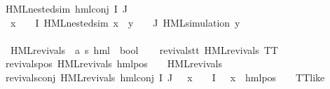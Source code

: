 \begin{isabellebody}
{\isachardoublequoteopen}HML{\isacharunderscore}{\kern0pt}{}{\isacharunderscore}{\kern0pt}nested{\isacharunderscore}{\kern0pt}sim\ {\isacharparenleft}{\kern0pt}hml{\isacharunderscore}{\kern0pt}conj\ I\ J\ {\isasymPhi}{\isacharparenright}{\kern0pt}{\isachardoublequoteclose}\ \isanewline
{}\ {\isachardoublequoteopen}{\isacharparenleft}{\kern0pt}{\isasymforall}x\ {\isasymin}\ {\isacharparenleft}{\kern0pt}{\isasymPhi}\ {\isacharbackquote}{\kern0pt}\ I{\isacharparenright}{\kern0pt}{\isachardot}{\kern0pt}\ HML{\isacharunderscore}{\kern0pt}{}{\isacharunderscore}{\kern0pt}nested{\isacharunderscore}{\kern0pt}sim\ x{\isacharparenright}{\kern0pt}\ {\isasymand}\ {\isacharparenleft}{\kern0pt}{\isasymforall}y\ {\isasymin}\ {\isacharparenleft}{\kern0pt}{\isasymPhi}\ {\isacharbackquote}{\kern0pt}\ J{\isacharparenright}{\kern0pt}{\isachardot}{\kern0pt}\ HML{\isacharunderscore}{\kern0pt}simulation\ y{\isacharparenright}{\kern0pt}{\isachardoublequoteclose}\isanewline
\ \ \ \ \ \ \ \ \ \ \ \ \ \ \ \ \ \ \ \ \ \ \ \ \ \ \ \ \ \ \ \ \ \ \ \ \ \ \ \ \ \ \ \ \ \ \ \ \ \ \ \ \ \ \ \ \ \ \ \ \ \ \ \ \isanewline
{}\isamarkupfalse%
\ HML{\isacharunderscore}{\kern0pt}revivals\ {\isacharcolon}{\kern0pt}{\isacharcolon}{\kern0pt}\ {\isachardoublequoteopen}{\isacharparenleft}{\kern0pt}{\isacharprime}{\kern0pt}a{\isacharcomma}{\kern0pt}\ {\isacharprime}{\kern0pt}s{\isacharparenright}{\kern0pt}\ hml\ {\isasymRightarrow}\ bool{\isachardoublequoteclose}\ \isanewline
\ \ \isanewline
revivals{\isacharunderscore}{\kern0pt}tt{\isacharcolon}{\kern0pt}\ {\isachardoublequoteopen}HML{\isacharunderscore}{\kern0pt}revivals\ TT{\isachardoublequoteclose}\ {\isacharbar}{\kern0pt}\isanewline
revivals{\isacharunderscore}{\kern0pt}pos{\isacharcolon}{\kern0pt}\ {\isachardoublequoteopen}HML{\isacharunderscore}{\kern0pt}revivals\ {\isacharparenleft}{\kern0pt}hml{\isacharunderscore}{\kern0pt}pos\ {\isasymalpha}\ {\isasymphi}{\isacharparenright}{\kern0pt}{\isachardoublequoteclose}\ \ {\isachardoublequoteopen}HML{\isacharunderscore}{\kern0pt}revivals\ {\isasymphi}{\isachardoublequoteclose}\ {\isacharbar}{\kern0pt}\isanewline
revivals{\isacharunderscore}{\kern0pt}conj{\isacharcolon}{\kern0pt}\ {\isachardoublequoteopen}HML{\isacharunderscore}{\kern0pt}revivals\ {\isacharparenleft}{\kern0pt}hml{\isacharunderscore}{\kern0pt}conj\ I\ J\ {\isasymPhi}{\isacharparenright}{\kern0pt}{\isachardoublequoteclose}\ \ {\isachardoublequoteopen}{\isacharparenleft}{\kern0pt}{\isasymforall}x\ {\isasymin}\ {\isacharparenleft}{\kern0pt}{\isasymPhi}\ {\isacharbackquote}{\kern0pt}\ I{\isacharparenright}{\kern0pt}{\isachardot}{\kern0pt}\ {\isasymexists}{\isasymalpha}\ {\isasymchi}{\isachardot}{\kern0pt}\ {\isacharparenleft}{\kern0pt}x\ {\isacharequal}{\kern0pt}\ hml{\isacharunderscore}{\kern0pt}pos\ {\isasymalpha}\ {\isasymchi}{\isacharparenright}{\kern0pt}\ {\isasymand}\ TT{\isacharunderscore}{\kern0pt}like\ {\isasymchi}{\isacharparenright}{\kern0pt}{\isachardoublequoteclose}\isanewline

\end{isabellebody}
